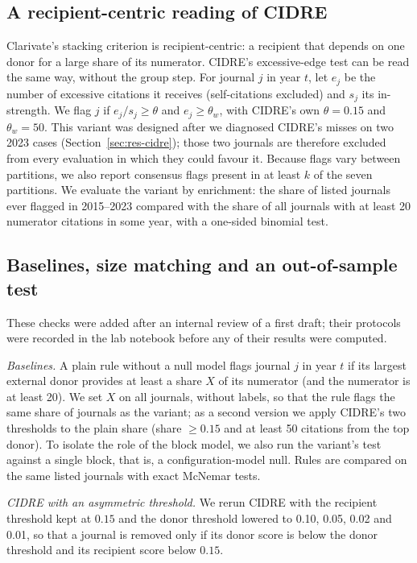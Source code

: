 \subsection{A recipient-centric reading of CIDRE}
Clarivate's stacking criterion is recipient-centric: a recipient that depends on one donor for a large share of its
numerator. CIDRE's excessive-edge test can be read the same way, without the group step. For journal $j$ in year
$t$, let $e_j$ be the number of excessive citations it receives (self-citations excluded) and $s_j$ its in-strength.
We flag $j$ if $e_j/s_j \ge \theta$ and $e_j \ge \theta_w$, with CIDRE's own $\theta=0.15$ and $\theta_w=50$. This
variant was designed after we diagnosed CIDRE's misses on two 2023 cases (Section~\ref{sec:res-cidre}); those two
journals are therefore excluded from every evaluation in which they could favour it. Because flags vary between
partitions, we also report consensus flags present in at least $k$ of the seven partitions. We evaluate the variant by
enrichment: the share of listed journals ever flagged in 2015--2023 compared with the share of all journals with at
least 20 numerator citations in some year, with a one-sided binomial test.

\subsection{Baselines, size matching and an out-of-sample test}\label{sec:m-robust}
These checks were added after an internal review of a first draft; their protocols were recorded in the lab notebook
before any of their results were computed.

\emph{Baselines.} A plain rule without a null model flags journal $j$ in year $t$ if its largest external donor
provides at least a share $X$ of its numerator (and the numerator is at least 20). We set $X$ on all journals, without
labels, so that the rule flags the same share of journals as the variant; as a second version we apply CIDRE's two
thresholds to the plain share (share $\ge0.15$ and at least 50 citations from the top donor). To isolate the role of
the block model, we also run the variant's test against a single block, that is, a configuration-model null. Rules are
compared on the same listed journals with exact McNemar tests.

\emph{CIDRE with an asymmetric threshold.} We rerun CIDRE with the recipient threshold kept at $0.15$ and the donor
threshold lowered to 0.10, 0.05, 0.02 and 0.01, so that a journal is removed only if its donor score is below the
donor threshold and its recipient score below $0.15$.

